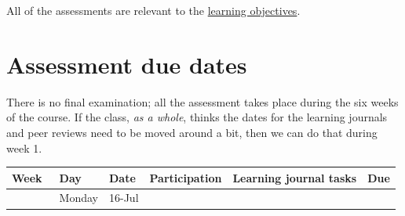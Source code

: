 \documentclass[]{book}
\theoremstyle{definition}
\theoremstyle{definition}
\theoremstyle{definition}
\theoremstyle{remark}
\begin{document}
All of the assessments are relevant to the
\protect\hyperlink{learning-objectives}{learning objectives}.

\hypertarget{assessment-due-dates}{%
\section{Assessment due dates}\label{assessment-due-dates}}

There is no final examination; all the assessment takes place during the
six weeks of the course. If the class, \emph{as a whole}, thinks the
dates for the learning journals and peer reviews need to be moved around
a bit, then we can do that during week 1.

\begin{longtable}[]{@{}rllllr@{}}
\toprule
\begin{minipage}[b]{0.08\columnwidth}\raggedleft
Week~\strut
\end{minipage} & \begin{minipage}[b]{0.12\columnwidth}\raggedright
Day\strut
\end{minipage} & \begin{minipage}[b]{0.09\columnwidth}\raggedright
Date\strut
\end{minipage} & \begin{minipage}[b]{0.16\columnwidth}\raggedright
Participation\strut
\end{minipage} & \begin{minipage}[b]{0.29\columnwidth}\raggedright
Learning journal tasks\strut
\end{minipage} & \begin{minipage}[b]{0.08\columnwidth}\raggedleft
Due\strut
\end{minipage}\tabularnewline
\midrule
\endhead
\begin{minipage}[t]{0.08\columnwidth}\raggedleft
1\strut
\end{minipage} & \begin{minipage}[t]{0.12\columnwidth}\raggedright
Monday\strut
\end{minipage} & \begin{minipage}[t]{0.09\columnwidth}\raggedright
16-Jul\strut
\end{minipage} & \begin{minipage}[t]{0.16\columnwidth}\raggedright
\strut
\end{minipage} & \begin{minipage}[t]{0.29\columnwidth}\raggedright
\strut
\end{minipage} & \begin{minipage}[t]{0.08\columnwidth}\raggedleft

\end{minipage}
\end{longtable}
\end{document}
